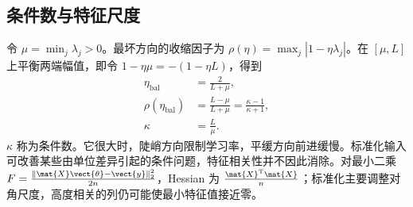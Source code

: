 \documentclass[../textbook.tex]{subfiles}
\begin{document}
\subsection{条件数与特征尺度}
令 $\mu=\min_j\lambda_j>0$。最坏方向的收缩因子为
$\rho(\eta)=\max_j|1-\eta\lambda_j|$。在 $[\mu,L]$ 上平衡两端幅值，即令 $1-\eta\mu=-(1-\eta L)$，得到
\begin{equation}
\begin{aligned}
 \eta_{\mathrm{bal}} &= \frac2{L+\mu}, \\
 \rho(\eta_{\mathrm{bal}}) &= \frac{L-\mu}{L+\mu} = \frac{\kappa-1}{\kappa+1}, \\
 \kappa &= \frac L\mu.
\end{aligned}
\end{equation}
$\kappa$ 称为条件数。它很大时，陡峭方向限制学习率，平缓方向前进缓慢。标准化输入可改善某些由单位差异引起的条件问题，特征相关性并不因此消除。对最小二乘 $F=\frac{\|\mat{X}\vect{\theta}-\vect{y}\|_2^2}{2n}$，Hessian 为 $\frac{\mat{X}^{\mathrm{T}}\mat{X}}{n}$；标准化主要调整对角尺度，高度相关的列仍可能使最小特征值接近零。
\end{document}

